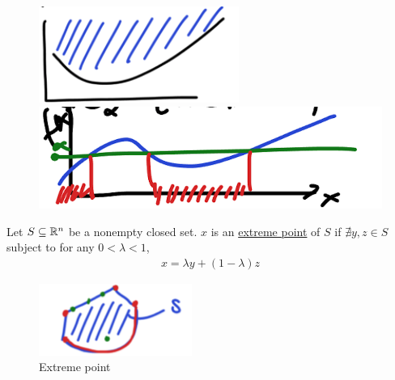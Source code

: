 \documentclass[11pt]{article}
\numberwithin{equation}{section}
\begin{document}
\begin{figure}[H]
    \centering
    \begin{minipage}{.5\textwidth}
      \centering
      \includegraphics[width=.9\linewidth]{images/2-ex-4.png}
    \end{minipage}%
    \begin{minipage}{.5\textwidth}
      \centering
      \includegraphics[width=.9\linewidth]{images/2-ex-5.png}
    \end{minipage}
\end{figure}

\begin{definition}
    Let $S \subseteq \mathbb R^n$ be a nonempty closed set. $x$ is an \underline{extreme point} of $S$ if $\nexists y,z \in S$ subject to for any $0 < \lambda < 1$, \begin{align*}
        x=\lambda y+(1-\lambda) z
    \end{align*}
\end{definition}

\begin{figure}[H]
    \centering
    \includegraphics[width = 5cm]{images/1-ex-4.png}
    \caption{Extreme point}
\end{figure}
\end{document}
